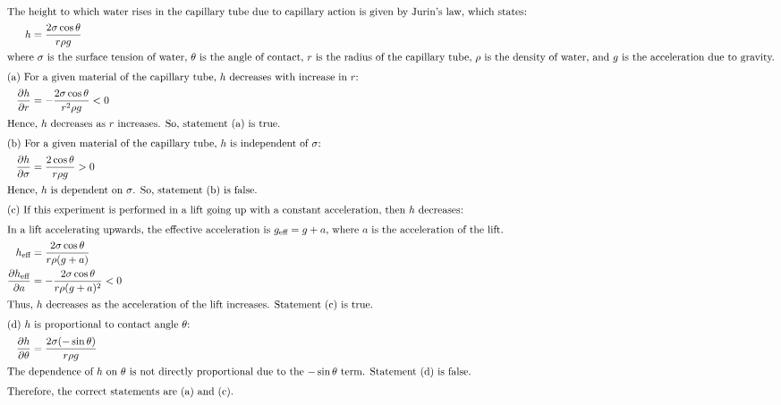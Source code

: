     \begin{solution}
        \begin{align*}
            \intertext{The height to which water rises in the capillary tube due to capillary action is given by Jurin's law, which states:}
            h &= \frac{2\sigma\cos\theta}{r\rho g}\\
            \intertext{where \( \sigma \) is the surface tension of water, \( \theta \) is the angle of contact, \( r \) is the radius of the capillary tube, \( \rho \) is the density of water, and \( g \) is the acceleration due to gravity.}
            \intertext{(a) For a given material of the capillary tube, \( h \) decreases with increase in \( r \):}
            \frac{\partial h}{\partial r} &= -\frac{2\sigma\cos\theta}{r^2\rho g} < 0\\
            \intertext{Hence, \( h \) decreases as \( r \) increases. So, statement (a) is true.}
            \intertext{(b) For a given material of the capillary tube, \( h \) is independent of \( \sigma \):}
            \frac{\partial h}{\partial \sigma} &= \frac{2\cos\theta}{r\rho g} > 0\\
            \intertext{Hence, \( h \) is dependent on \( \sigma \). So, statement (b) is false.}
            \intertext{(c) If this experiment is performed in a lift going up with a constant acceleration, then \( h \) decreases:}
            \intertext{In a lift accelerating upwards, the effective acceleration is \( g_{\text{eff}} = g + a \), where \( a \) is the acceleration of the lift.}
            h_{\text{eff}} &= \frac{2\sigma\cos\theta}{r\rho(g + a)}\\
            \frac{\partial h_{\text{eff}}}{\partial a} &= -\frac{2\sigma\cos\theta}{r\rho(g + a)^2} < 0\\
            \intertext{Thus, \( h \) decreases as the acceleration of the lift increases. Statement (c) is true.}
            \intertext{(d) \( h \) is proportional to contact angle \( \theta \):}
            \frac{\partial h}{\partial \theta} &= \frac{2\sigma(-\sin\theta)}{r\rho g}\\
            \intertext{The dependence of \( h \) on \( \theta \) is not directly proportional due to the \(-\sin\theta\) term. Statement (d) is false.}
            \intertext{Therefore, the correct statements are (a) and (c).}
        \end{align*}
    \end{solution}